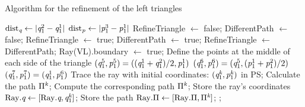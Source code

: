 \begin{algorithm}[h]
\caption{Algorithm for the refinement of the left triangles}\label{alg:left_triangle}
\begin{algorithmic}[1]
\State $\textrm{dist}_{\textit{q}}\gets \mbox{$|\textit{q}_1^2-\textit{q}_1^1|$}$
\State $\textrm{dist}_{\textit{p}}\gets \mbox{$|\textit{p}_1^{3}-\textit{p}_1^1|$}$
\State RefineTriangle $\gets$  false;
\State DifferentPath $\gets$  false;
\State RefineTriangle $\gets$  true;
\EndIf
{}
\State DifferentPath $\gets$  true;
\EndIf
\EndFor
{}
\State RefineTriangle $\gets$  DifferentPath;
\Else
{}
\State Ray(\textrm{VL}).boundary $\gets$ true; 
\EndIf
\EndIf
{}
\State Define the points at the middle of each side of the triangle
\State $(\textit{q}_1^5, \textit{p}_1^5) = ((\textit{q}_1^1+\textit{q}_1^2)/2, \textit{p}_1^1)$
\State $(\textit{q}_1^6, \textit{p}_1^6) = (\textit{q}_1^5, (\textit{p}_1^1+\textit{p}_1^2)/2)$
\State $(\textit{q}_1^7, \textit{p}_1^7) = (\textit{q}_1^1, \textit{p}_1^6)$
\State Trace the ray with initial coordinates: $(\textit{q}_1^{\textit{k}}, \textit{p}_1^{\textit{k}})$ in PS;
\State Calculate the path $\Pi^{\textit{k}}$;
\State Compute the corresponding path $\Pi^{\textit{k}}$;
\State Store the ray's coordinates $\mbox{Ray}.\textit{q}\gets [\mbox{Ray}.\textit{q}, \textit{q}_1^{\textit{k}}]$;
\State Store the path $\mbox{Ray}.\Pi\gets [\mbox{Ray}.\Pi, \Pi^{\textit{k}}]$;
\EndIf
\EndFor
\State{};

\end{algorithmic}
\end{algorithm}
